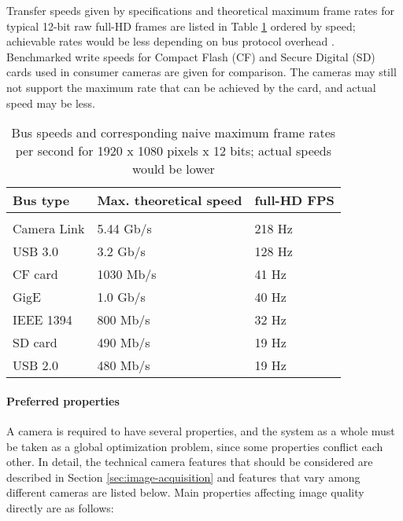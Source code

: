 Transfer speeds given by specifications and theoretical maximum frame rates for typical 12-bit raw full-HD frames are listed in Table \ref{tab:busspeeds} ordered by speed; achievable rates would be less depending on bus protocol overhead \cite{hornberg2007handbook,ni2013choosing}.
Benchmarked \cite{tomshw-sdwrite,tomshw-cfwrite} write speeds for Compact Flash (CF) and Secure Digital (SD) cards used in consumer cameras are given for comparison.
The cameras may still not support the maximum rate that can be achieved by the card, and actual speed may be less.

\begin{table}[h]
	\centering
	\begin{tabular}{l l l}
		Bus type & Max. theoretical speed & full-HD FPS\\
		\hline \\
		Camera Link & 5.44 Gb/s & 218 Hz\\
		USB 3.0 & 3.2 Gb/s & 128 Hz\\
		CF card \cite{tomshw-cfwrite} & 1030 Mb/s & 41 Hz\\
		GigE & 1.0 Gb/s & 40 Hz\\
		IEEE 1394 & 800 Mb/s & 32 Hz\\
		SD card \cite{tomshw-sdwrite} & 490 Mb/s & 19 Hz\\
		USB 2.0 & 480 Mb/s & 19 Hz\\
	\end{tabular}
	\caption{Bus speeds and corresponding naive maximum frame rates per second for 1920 x 1080 pixels x 12 bits; actual speeds would be lower}
	\label{tab:busspeeds}
\end{table}

\paragraph{Preferred properties}
A camera is required to have several properties, and the system as a whole must be taken as a global optimization problem, since some properties conflict each other.
In detail, the technical camera features that should be considered are described in Section \ref{sec:image-acquisition} and features that vary among different cameras are listed below.
Main properties affecting image quality directly are as follows:

